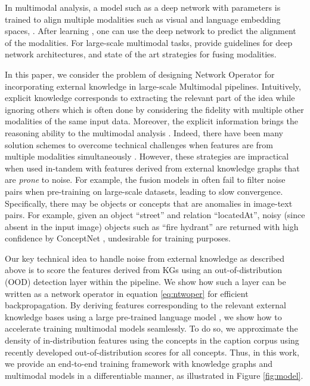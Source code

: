 \documentclass{article}
\begin{document}
In multimodal analysis, a model such as a deep network with parameters  is trained to align multiple modalities such as visual and language embedding spaces,  \cite{radford2021learning,ngiam2011multimodal}. After learning  , one can use the deep network to predict the alignment of the modalities. For large-scale multimodal tasks, \cite{zhang2020multimodal, kim2021vilt} provide guidelines for deep network architectures, and state of the art strategies for fusing modalities. 

In this paper, we consider the problem of designing Network Operator  for  incorporating external knowledge in large-scale  Multimodal pipelines. Intuitively, explicit knowledge corresponds to extracting the relevant part of the idea while ignoring others which is often done by considering the fidelity with multiple other modalities of the same input data. Moreover, the explicit information brings the reasoning ability to the multimodal analysis \cite{gui2021kat}. Indeed, there have been many solution schemes to overcome technical challenges when features are from multiple modalities  simultaneously \cite{chen2020uniter, li2021align}.  However, these strategies are impractical when used in-tandem with features derived from external knowledge graphs that are {\em prone} to noise. For example, the fusion models in \cite{gan2020large, zhang2021vinvl} often fail to filter noise pairs when pre-training on large-scale datasets, leading to slow convergence. Specifically, there may be objects or concepts that are anomalies in image-text pairs. For example, given an object ``street'' and relation ``locatedAt'', noisy (since absent in the input image) objects such as ``fire hydrant''  are returned with high confidence by ConceptNet \cite{speer2017conceptnet}, undesirable for training purposes.
 
 
 Our key technical idea to handle noise from external knowledge as described above is to score the features derived from KGs using an out-of-distribution (OOD) detection layer within the pipeline. We show how such a layer can be written as a network operator  in equation \eqref{eq:ntwoper} for efficient backpropagation. By deriving features corresponding to the relevant external knowledge bases using a large pre-trained language model \cite{liu2019roberta,brown2020language}, we show how to accelerate training multimodal models seamlessly. To do so, we approximate the density of in-distribution features using the concepts in the caption corpus using recently developed out-of-distribution scores \cite{morteza2022provable} for all concepts. Thus, in this work, we provide an end-to-end training framework with knowledge graphs and multimodal models in a differentiable manner, as illustrated in Figure \ref{fig:model}. 
\end{document}
